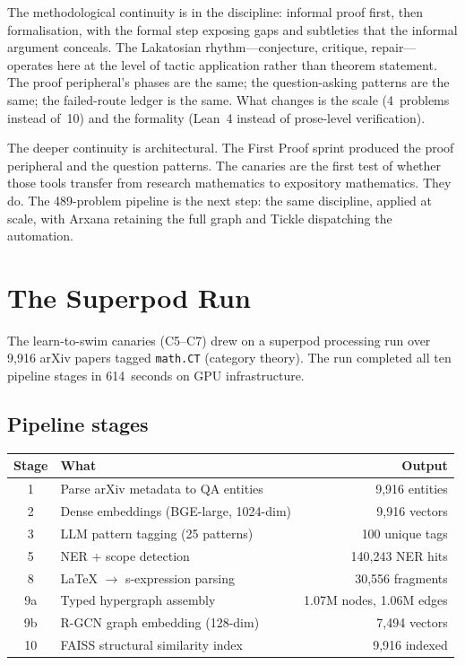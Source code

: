 \documentclass[12pt,oneside]{book}
\theoremstyle{plain}
\theoremstyle{definition}
\theoremstyle{remark}
\begin{document}
The methodological continuity is in the discipline: informal proof first,
then formalisation, with the formal step exposing gaps and subtleties
that the informal argument conceals. The Lakatosian
rhythm---conjecture, critique, repair---operates here at the level of
tactic application rather than theorem statement. The proof peripheral's
phases are the same; the question-asking patterns are the same; the
failed-route ledger is the same. What changes is the scale (4~problems
instead of~10) and the formality (Lean~4 instead of prose-level
verification).

The deeper continuity is architectural. The First Proof sprint produced
the proof peripheral and the question patterns. The canaries are the
first test of whether those tools transfer from research mathematics to
expository mathematics. They do. The 489-problem pipeline is the next
step: the same discipline, applied at scale, with Arxana retaining the
full graph and Tickle dispatching the automation.

\appendix
\chapter{The Superpod Run}\label{app:superpod}

The learn-to-swim canaries (C5--C7) drew on a superpod processing run
over 9{,}916 arXiv papers tagged \texttt{math.CT} (category theory).
The run completed all ten pipeline stages in 614~seconds on GPU
infrastructure.

\section{Pipeline stages}

\begin{center}
\begin{tabular}{clr}
\toprule
\textbf{Stage} & \textbf{What} & \textbf{Output} \\
\midrule
1 & Parse arXiv metadata to QA entities & 9{,}916 entities \\
2 & Dense embeddings (BGE-large, 1024-dim) & 9{,}916 vectors \\
3 & LLM pattern tagging (25 patterns) & 100 unique tags \\
5 & NER + scope detection & 140{,}243 NER hits \\
8 & LaTeX $\to$ s-expression parsing & 30{,}556 fragments \\
9a & Typed hypergraph assembly & 1.07M nodes, 1.06M edges \\
9b & R-GCN graph embedding (128-dim) & 7{,}494 vectors \\
10 & FAISS structural similarity index & 9{,}916 indexed \\
\bottomrule
\end{tabular}
\end{center}
\end{document}
